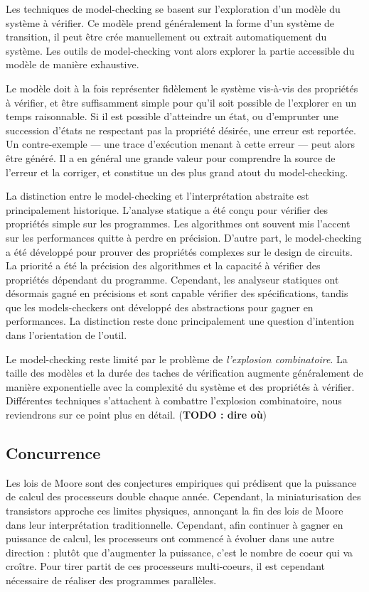 Les techniques de model-checking se basent sur l'exploration d'un modèle
du système à vérifier. Ce modèle prend généralement la forme d'un
système de transition, il peut être crée manuellement ou extrait
automatiquement du système. Les outils de model-checking vont alors
explorer la partie accessible du modèle de manière exhaustive.

Le modèle doit à la fois représenter fidèlement le système vis-à-vis des
propriétés à vérifier, et être suffisamment simple pour qu'il soit
possible de l'explorer en un temps raisonnable. Si il est possible
d'atteindre un état, ou d'emprunter une succession d'états ne respectant
pas la propriété désirée, une erreur est reportée. Un contre-exemple ---
une trace d'exécution menant à cette erreur --- peut alors être généré.
Il a en général une grande valeur pour comprendre la source de l'erreur
et la corriger, et constitue un des plus grand atout du model-checking.

La distinction entre le model-checking et l'interprétation abstraite est
principalement historique. L'analyse statique a été conçu pour vérifier
des propriétés simple sur les programmes. Les algorithmes ont souvent
mis l'accent sur les performances quitte à perdre en précision. D'autre
part, le model-checking a été développé pour prouver des propriétés
complexes sur le design de circuits. La priorité a été la précision des
algorithmes et la capacité à vérifier des propriétés dépendant du
programme. Cependant, les analyseur statiques ont désormais gagné en
précisions et sont capable vérifier des spécifications, tandis que les
models-checkers ont développé des abstractions pour gagner en
performances. La distinction reste donc principalement une question
d'intention dans l'orientation de l'outil.

Le model-checking reste limité par le problème de \emph{l'explosion
combinatoire}. La taille des modèles et la durée des taches de
vérification augmente généralement de manière exponentielle avec la
complexité du système et des propriétés à vérifier. Différentes
techniques s'attachent à combattre l'explosion combinatoire, nous
reviendrons sur ce point plus en détail. (\textbf{TODO : dire où})

\subsection{Concurrence}

Les lois de Moore sont des conjectures empiriques qui prédisent que la
puissance de calcul des processeurs double chaque année. Cependant, la
miniaturisation des transistors approche ces limites physiques,
annonçant la fin des lois de Moore dans leur interprétation
traditionnelle. Cependant, afin continuer à gagner en puissance de
calcul, les processeurs ont commencé à évoluer dans une autre direction
: plutôt que d'augmenter la puissance, c'est le nombre de coeur qui va
croître. Pour tirer partit de ces processeurs multi-coeurs, il est
cependant nécessaire de réaliser des programmes parallèles.

